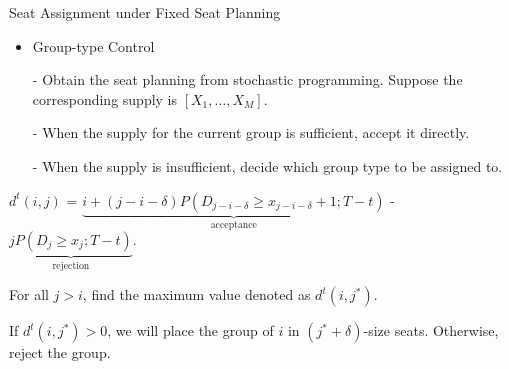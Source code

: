   \begin{frame}{Seat Assignment under Fixed Seat Planning}
    \small
    \begin{itemize}
      \item Group-type Control
      \item[-] Obtain the seat planning from stochastic programming. Suppose the corresponding supply is $[X_1, \ldots, X_M]$. 
      \item[-] When the supply for the current group is sufficient, accept it directly.
      \item[-] When the supply is insufficient, decide which group type to be assigned to.
    \end{itemize}

    $d^{t}(i, j)$ = $\underbrace{i + (j-i-\delta)P(D_{j-i-\delta} \geq x_{j-i-\delta}+1; T-t)}_{\text{acceptance}}$ - $\underbrace{j P(D_{j} \geq x_{j}; T-t)}_{\text{rejection}}.$

    For all $j > i$, find the maximum value denoted as $d^{t}(i, j^{*})$.
    
    If $d^{t}(i, j^{*}) > 0$, we will place the group of $i$ in $(j^{*} + \delta)$-size seats. Otherwise, reject the group.

  \end{frame}
  


